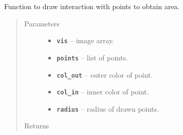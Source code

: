 \documentclass[letterpaper,10pt,english]{sphinxmanual}
\begin{document}

\begin{fulllineitems}
\label{RRtoolbox.lib:RRtoolbox.lib.image.drawcoorarea}
Function to draw interaction with points to obtain area.
\begin{quote}\begin{description}
\item[{Parameters}] \leavevmode\begin{itemize}
\item {} 
\textbf{\texttt{vis}} -- image array.

\item {} 
\textbf{\texttt{points}} -- list of points.

\item {} 
\textbf{\texttt{col\_out}} -- outer color of point.

\item {} 
\textbf{\texttt{col\_in}} -- inner color of point.

\item {} 
\textbf{\texttt{radius}} -- radius of drawn points.

\end{itemize}

\item[{Returns}] \leavevmode


\end{description}\end{quote}

\end{fulllineitems}

\end{document}
